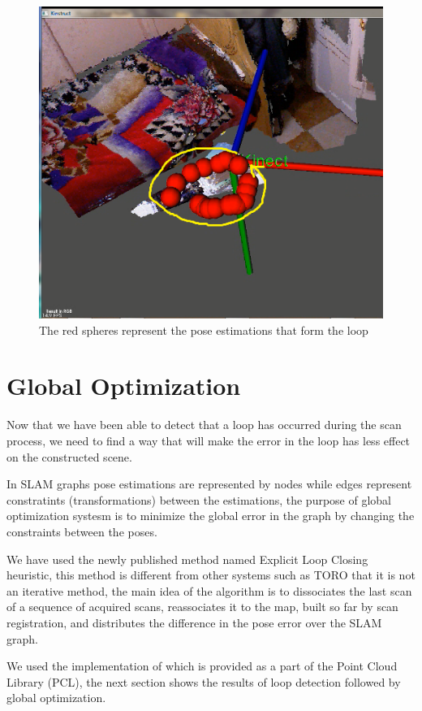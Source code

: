 \begin{figure}[H]
\centering
\includegraphics{Loop/loop.png}
\caption{The red spheres represent the pose estimations that form the loop}
\label{fig:loop}
\end{figure}

\pagebreak
\section{Global Optimization}

Now that we have been able to detect that a loop has occurred during the scan process, we need to find a way that will make the error in the loop has less effect on the constructed scene.

In SLAM graphs pose estimations are represented by nodes while edges represent constratints (transformations) between the estimations, the purpose of global optimization systesm is to minimize the global error in the graph by changing the constraints between the poses.

We have used the newly published method named Explicit Loop Closing heuristic, this method is different from other systems such as TORO that it is not an iterative method, the main idea of the algorithm is to dissociates the last scan of a sequence of acquired scans, reassociates it to the map, built so far by scan registration, and distributes the difference in the pose error over
the SLAM graph.

We used the implementation of which is provided as a part of the Point Cloud Library (PCL), the next section shows the results of loop detection followed by global optimization.

